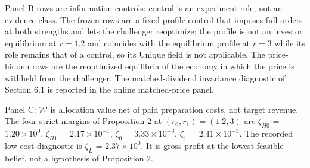 \begin{threeparttable}
\begin{tablenotes}
\item Panel B rows are information controls: control is an experiment role, not an evidence class. The frozen rows are a fixed-profile control that imposes full orders at both strengths and lets the challenger reoptimize; the profile is not an investor equilibrium at $r=1.2$ and coincides with the equilibrium profile at $r=3$ while its role remains that of a control, so its Unique field is not applicable. The price-hidden rows are the reoptimized equilibria of the economy in which the price is withheld from the challenger. The matched-dividend invariance diagnostic of Section 6.1 is reported in the online matched-price panel.
\item Panel C: $\mathcal{W}$ is allocation value net of paid preparation costs, not target revenue. The four strict margins of Proposition 2 at $(r_0,r_1)=(1.2,3)$ are $\zeta_{H0}$ = $1.20\times10^{0}$, $\zeta_{H1}$ = $2.17\times10^{-1}$, $\zeta_0$ = $3.33\times10^{-3}$, $\zeta_1$ = $2.41\times10^{-3}$. The recorded low-cost diagnostic is $\zeta_L$ = $2.37\times10^{0}$. It is gross profit at the lowest feasible belief, not a hypothesis of Proposition 2.
\end{tablenotes}
\end{threeparttable}
